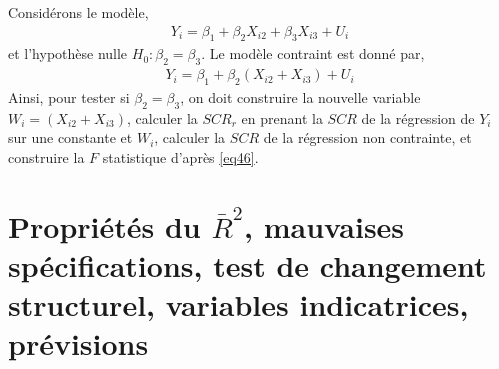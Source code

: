 \documentclass[10pt, reqno]{amsart}
\begin{document}
\begin{exemple} Considérons le modèle,
\begin{align*}
Y_i = \beta_1 + \beta_2X_{i2} + \beta_3X_{i3}+U_i
\end{align*}
et l'hypothèse nulle $H_0: \beta_2 = \beta_3$. Le modèle contraint est donné par,
\begin{align*}
Y_i=\beta_1+\beta_2(X_{i2}+X_{i3})+U_i
\end{align*}
Ainsi, pour tester si $\beta_2=\beta_3$, on doit construire la nouvelle variable $W_i = (X_{i2}+X_{i3})$, calculer la $SCR_r$ en prenant la $SCR$ de la régression de $Y_i$ sur une constante et $W_i$, calculer la $SCR$ de la régression non contrainte, et construire la $F$ statistique d'après \eqref{eq46}.
\label{ex2}
\end{exemple}

\newpage

\section{Propriétés du $\bar{R}^2$, mauvaises spécifications, test de changement structurel, variables indicatrices, prévisions}
\end{document}
